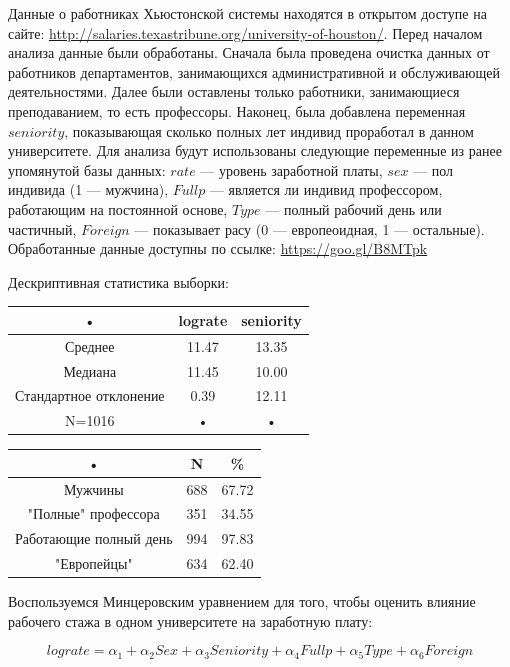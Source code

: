 \documentclass[a4paper, 12pt]{article}
\theoremstyle{definition}
\theoremstyle{plain}
\begin{document}
Данные о работниках Хьюстонской системы находятся в открытом доступе на сайте: \url{http://salaries.texastribune.org/university-of-houston/}. Перед началом анализа данные были обработаны. Сначала была проведена очистка данных от работников департаментов, занимающихся административной и обслуживающей деятельностями. Далее были оставлены только работники, занимающиеся преподаванием, то есть профессоры. Наконец, была добавлена переменная $seniority$, показывающая сколько полных лет индивид проработал в данном университете.
Для анализа будут использованы следующие переменные из ранее упомянутой базы данных: $rate$ --- уровень заработной платы, $sex$ --- пол индивида (1 --- мужчина), $Fullp$ --- является ли индивид профессором, работающим на постоянной основе, $Type$ --- полный рабочий день или частичный, $Foreign$ --- показывает расу (0 --- европеоидная, 1 --- остальные). Обработанные данные доступны по ссылке: \url{https://goo.gl/B8MTpk}

Дескриптивная статистика выборки:

\begin{center}
\begin{tabular}{|c|c|c|}
\hline
• & lograte & seniority \\
\hline
Среднее & 11.47 & 13.35 \\
\hline
Медиана & 11.45 & 10.00 \\
\hline
Стандартное отклонение & 0.39 & 12.11 \\
\hline
N=1016 & • & • \\
\hline
\end{tabular}
\end{center}

\begin{center}
\begin{tabular}{|c|c|c|}
\hline
• & N & \% \\
\hline
Мужчины & 688 & 67.72 \\
\hline
"Полные" профессора & 351 & 34.55 \\
\hline
Работающие полный день & 994 & 97.83 \\
\hline
"Европейцы" & 634 & 62.40 \\
\hline
\end{tabular}
\end{center}

Воспользуемся Минцеровским уравнением для того, чтобы оценить влияние рабочего стажа в одном университете на заработную плату:

$$lograte=\alpha_1+\alpha_2 Sex+\alpha_3 Seniority +\alpha_4 Fullp+\alpha_5 Type +\alpha_6 Foreign$$
\end{document}
